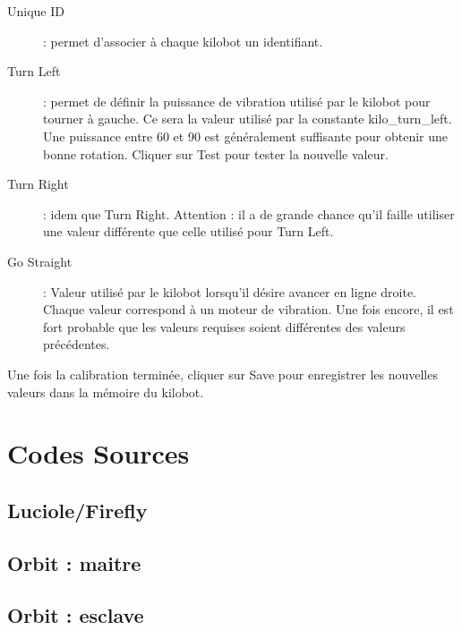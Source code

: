 \documentclass[a4paper,8pt]{report}
\begin{document}
\begin{description}
\item[Unique ID] : permet d'associer à chaque kilobot un identifiant.
\item[Turn Left] : permet de définir la puissance de vibration utilisé par le kilobot pour tourner à gauche. Ce sera la valeur utilisé par la constante kilo\_turn\_left. Une puissance entre 60 et 90 est généralement suffisante pour obtenir une bonne rotation. Cliquer sur Test pour tester la nouvelle valeur.
\item[Turn Right] : idem que Turn Right. Attention : il a de grande chance qu'il faille utiliser une valeur différente que celle utilisé pour Turn Left.
\item[Go Straight] : Valeur utilisé par le kilobot lorsqu'il désire avancer en ligne droite. Chaque valeur correspond à un moteur de vibration. Une fois encore, il est fort probable que les valeurs requises soient différentes des valeurs précédentes.
\end{description}

Une fois la calibration terminée, cliquer sur Save pour enregistrer les nouvelles valeurs dans la mémoire du kilobot.

\newpage
\section*{Codes Sources}\label{sec:name}

\subsection*{Luciole/Firefly}\label{sec:name}


\newpage
\subsection*{Orbit : maitre}\label{sec:name}


\newpage
\subsection*{Orbit : esclave}\label{sec:name}

\end{document}
